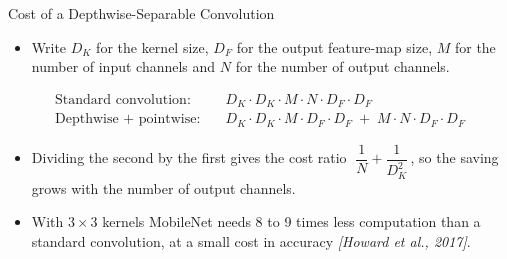 \begin{frame}{Cost of a Depthwise-Separable Convolution}
    \begin{itemize}
        \item Write \(D_K\) for the kernel size, \(D_F\) for the output feature-map size, \(M\) for the number of input channels and \(N\) for the number of output channels.
    \end{itemize}
    \begin{align*}
        \text{Standard convolution:} \quad & D_K \cdot D_K \cdot M \cdot N \cdot D_F \cdot D_F \\
        \text{Depthwise + pointwise:} \quad & D_K \cdot D_K \cdot M \cdot D_F \cdot D_F \;+\; M \cdot N \cdot D_F \cdot D_F
    \end{align*}
    \begin{itemize}
        \item Dividing the second by the first gives the cost ratio
        \(\;\dfrac{1}{N} + \dfrac{1}{D_K^{2}}\,\), so the saving grows with the number of output channels.
        \item With \(3\times3\) kernels MobileNet needs 8 to 9 times less computation than a standard convolution, at a small cost in accuracy \emph{[Howard et al., 2017]}.
    \end{itemize}
\end{frame}

